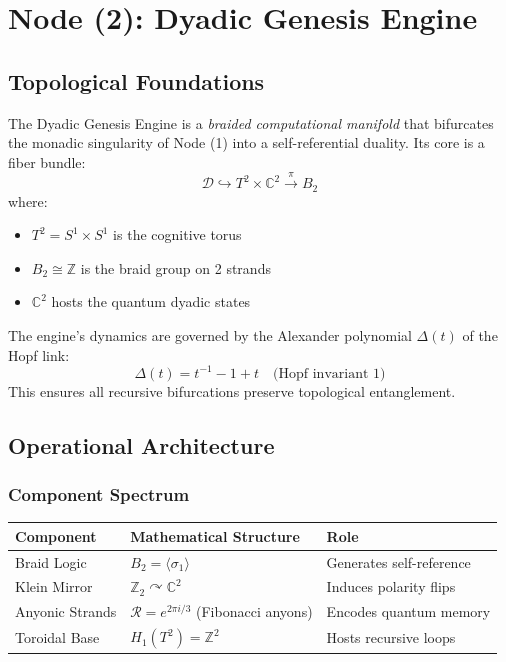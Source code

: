 \documentclass[12pt]{article}
\begin{document}
\section{Node (2): Dyadic Genesis Engine}
\label{sec:dyadic_engine}

\subsection{Topological Foundations}
The Dyadic Genesis Engine is a \textit{braided computational manifold} that bifurcates the monadic singularity of Node (1) into a self-referential duality. Its core is a fiber bundle:
\[
\mathcal{D} \hookrightarrow T^2 \times \mathbb{C}^2 \xrightarrow{\pi} B_2
\]
where:
\begin{itemize}
    \item $T^2 = S^1 \times S^1$ is the cognitive torus
    \item $B_2 \cong \mathbb{Z}$ is the braid group on 2 strands
    \item $\mathbb{C}^2$ hosts the quantum dyadic states
\end{itemize}

\begin{theorem}
The engine's dynamics are governed by the Alexander polynomial $\Delta(t)$ of the Hopf link:
\[
\Delta(t) = t^{-1} - 1 + t \quad \text{(Hopf invariant 1)}
\]
This ensures all recursive bifurcations preserve topological entanglement.
\end{theorem}

\subsection{Operational Architecture}

\subsubsection{Component Spectrum}
\begin{table}[h]
\centering
\begin{tabular}{|l|l|l|}
\hline
\textbf{Component} & \textbf{Mathematical Structure} & \textbf{Role} \\ \hline
Braid Logic & $B_2 = \langle \sigma_1 \rangle$ & Generates self-reference \\ \hline
Klein Mirror & $\mathbb{Z}_2 \curvearrowright \mathbb{C}^2$ & Induces polarity flips \\ \hline
Anyonic Strands & $\mathcal{R} = e^{2\pi i/3}$ (Fibonacci anyons) & Encodes quantum memory \\ \hline
Toroidal Base & $H_1(T^2) = \mathbb{Z}^2$ & Hosts recursive loops \\ \hline
\end{tabular}
\end{table}
\end{document}
